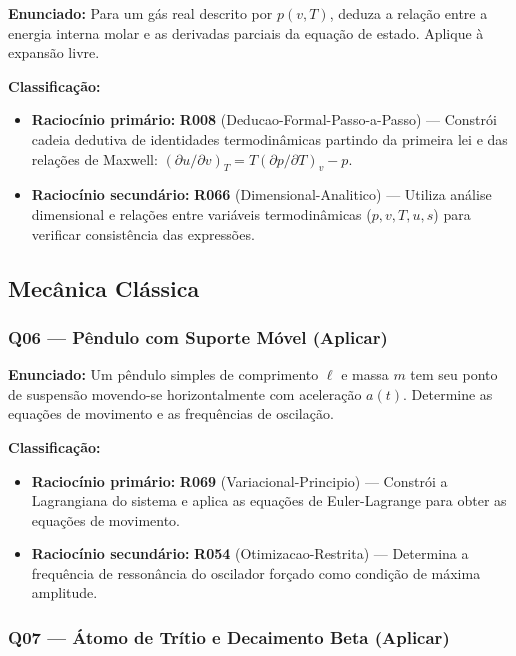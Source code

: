 \documentclass[12pt,a4paper]{article}
\newcommand{\rcode}[1]{\textcolor{azulprof}{\textbf{#1}}}
\newcommand{\bloom}[1]{\textcolor{verdeexame}{\textbf{#1}}}
\begin{document}
\textbf{Enunciado:} Para um gás real descrito por $p(v,T)$, deduza a
relação entre a energia interna molar e as derivadas parciais da
equação de estado. Aplique à expansão livre.

\medskip
\noindent\textbf{Classificação:}
\begin{itemize}
  \item \textbf{Raciocínio primário:} \rcode{R008} (Deducao-Formal-Passo-a-Passo) ---
    Constrói cadeia dedutiva de identidades termodinâmicas partindo da
    primeira lei e das relações de Maxwell: $(\partial u/\partial v)_T
    = T(\partial p/\partial T)_v - p$.
  \item \textbf{Raciocínio secundário:} \rcode{R066} (Dimensional-Analitico) ---
    Utiliza análise dimensional e relações entre variáveis termodinâmicas
    ($p, v, T, u, s$) para verificar consistência das expressões.
\end{itemize}

\subsection{Mecânica Clássica}

\subsubsection{Q06 --- Pêndulo com Suporte Móvel (\bloom{Aplicar})}

\textbf{Enunciado:} Um pêndulo simples de comprimento $\ell$ e massa $m$
tem seu ponto de suspensão movendo-se horizontalmente com aceleração
$a(t)$. Determine as equações de movimento e as frequências de oscilação.

\medskip
\noindent\textbf{Classificação:}
\begin{itemize}
  \item \textbf{Raciocínio primário:} \rcode{R069} (Variacional-Principio) ---
    Constrói a Lagrangiana do sistema e aplica as equações de
    Euler-Lagrange para obter as equações de movimento.
  \item \textbf{Raciocínio secundário:} \rcode{R054} (Otimizacao-Restrita) ---
    Determina a frequência de ressonância do oscilador forçado como
    condição de máxima amplitude.
\end{itemize}

\subsubsection{Q07 --- Átomo de Trítio e Decaimento Beta (\bloom{Aplicar})}
\end{document}
